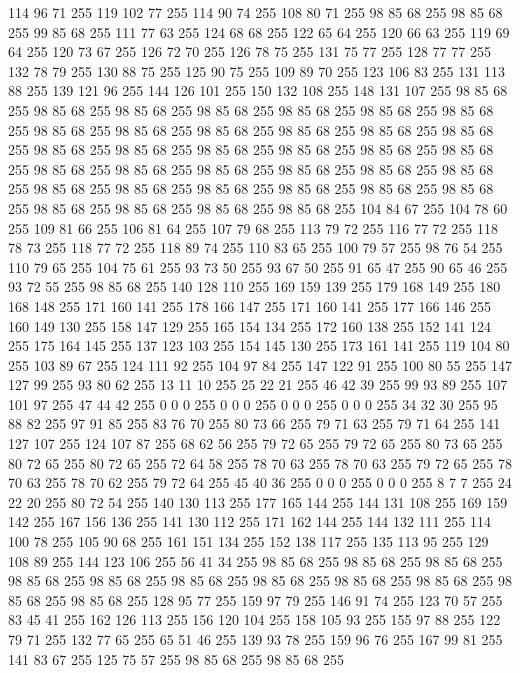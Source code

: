 114 96 71 255 119 102 77 255 114 90 74 255 108 80 71 255 98 85 68 255 98 85 68 255 99 85 68 255 111 77 63 255 124 68 68 255 122 65 64 255 120 66 63 255 119 69 64 255 120 73 67 255 126 72 70 255 126 78 75 255 131 75 77 255 128 77 77 255 132 78 79 255 130 88 75 255 125 90 75 255 109 89 70 255 123 106 83 255 131 113 88 255 139 121 96 255 144 126 101 255 150 132 108 255 148 131 107 255 98 85 68 255 98 85 68 255 98 85 68 255 98 85 68 255 98 85 68 255 98 85 68 255 98 85 68 255 98 85 68 255 98 85 68 255 98 85 68 255 98 85 68 255 98 85 68 255 98 85 68 255 98 85 68 255 98 85 68 255 98 85 68 255 98 85 68 255 98 85 68 255 98 85 68 255 98 85 68 255 98 85 68 255 98 85 68 255 98 85 68 255 98 85 68 255 98 85 68 255 98 85 68 255 98 85 68 255 98 85 68 255 98 85 68 255 98 85 68 255 98 85 68 255 98 85 68 255 98 85 68 255 98 85 68 255 98 85 68 255 104 84 67 255 104 78 60 255
109 81 66 255 106 81 64 255 107 79 68 255 113 79 72 255 116 77 72 255 118 78 73 255 118 77 72 255 118 89 74 255 110 83 65 255 100 79 57 255 98 76 54 255 110 79 65 255 104 75 61 255 93 73 50 255 93 67 50 255 91 65 47 255 90 65 46 255 93 72 55 255 98 85 68 255 140 128 110 255 169 159 139 255 179 168 149 255 180 168 148 255 171 160 141 255 178 166 147 255 171 160 141 255 177 166 146 255 160 149 130 255 158 147 129 255 165 154 134 255 172 160 138 255 152 141 124 255 175 164 145 255 137 123 103 255 154 145 130 255 173 161 141 255 119 104 80 255 103 89 67 255 124 111 92 255 104 97 84 255 147 122 91 255 100 80 55 255 147 127 99 255 93 80 62 255 13 11 10 255 25 22 21 255 46 42 39 255 99 93 89 255 107 101 97 255 47 44 42 255 0 0 0 255 0 0 0 255 0 0 0 255 0 0 0 255 34 32 30 255 95 88 82 255 97 91 85 255 83 76 70 255 80 73 66 255 79 71 63 255 79 71 64 255 141 127 107 255 124 107 87 255 68 62 56 255
79 72 65 255 79 72 65 255 80 73 65 255 80 72 65 255 80 72 65 255 72 64 58 255 78 70 63 255 78 70 63 255 79 72 65 255 78 70 63 255 78 70 62 255 79 72 64 255 45 40 36 255 0 0 0 255 0 0 0 255 8 7 7 255 24 22 20 255 80 72 54 255 140 130 113 255 177 165 144 255 144 131 108 255 169 159 142 255 167 156 136 255 141 130 112 255 171 162 144 255 144 132 111 255 114 100 78 255 105 90 68 255 161 151 134 255 152 138 117 255 135 113 95 255 129 108 89 255 144 123 106 255 56 41 34 255 98 85 68 255 98 85 68 255 98 85 68 255 98 85 68 255 98 85 68 255 98 85 68 255 98 85 68 255 98 85 68 255 98 85 68 255 98 85 68 255 98 85 68 255 128 95 77 255 159 97 79 255 146 91 74 255 123 70 57 255 83 45 41 255 162 126 113 255 156 120 104 255 158 105 93 255 155 97 88 255 122 79 71 255 132 77 65 255 65 51 46 255 139 93 78 255 159 96 76 255 167 99 81 255 141 83 67 255 125 75 57 255 98 85 68 255 98 85 68 255

